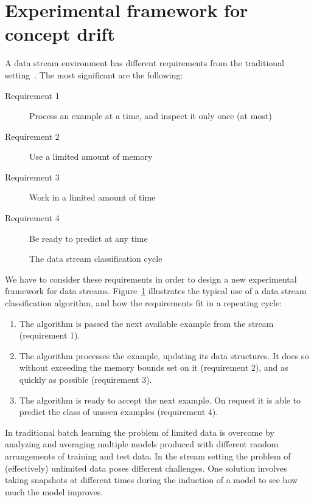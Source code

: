 \BEGINOMIT
\section{Experimental framework for concept drift}
\label{sec:expframe}

A data stream environment has different requirements from the traditional 
setting~\cite{Kirkby-PhD}. The most significant are the following: 
\begin{description}
\item[Requirement 1] Process an example at a time, and inspect
 it only once (at most)
\item[Requirement 2] Use a limited amount of memory
\item[Requirement 3] Work in a limited amount of time
\item[Requirement 4] Be ready to predict at any time
\end{description}
\begin{figure}[t]
\begin{center} 
\end{center} 
\caption{The data stream classification cycle}
\label{fig:cycle}
\end{figure} 
We have to consider these requirements in order to design a new experimental
framework for data streams.
Figure~\ref{fig:cycle} illustrates the typical use of a data stream 
classification algorithm, and how the requirements fit %
in a repeating cycle:
\begin{enumerate}
\item  The algorithm is passed the next available example from the stream
   (requirement 1).
\item  The algorithm processes the example, updating its data structures. It
   does so without exceeding the memory bounds set on it (requirement 2),
   and as quickly as possible (requirement 3).
\item  The algorithm is ready to accept the next example. On request it is
   able to predict the class of unseen examples
   (requirement 4).
\end{enumerate}


In traditional batch learning the problem of limited data is overcome
by analyzing and averaging multiple models produced with different random
arrangements of training and test data. In the stream setting the problem of
(effectively) unlimited data poses different challenges. One solution involves
taking snapshots at different times during the induction of a model to see how
much the model improves.

